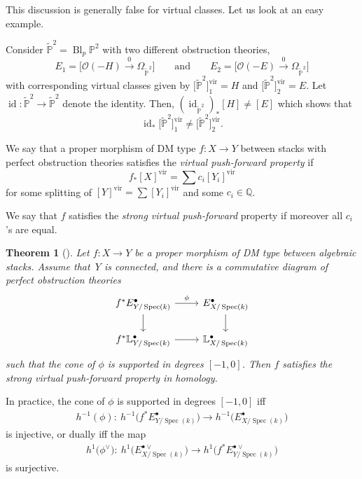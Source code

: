 \documentclass[pdftex]{sigma}
\numberwithin{equation}{section}
\newtheorem{Theorem}{Theorem}[section]
\newcommand{\vv}{\mathrm{vir}}
\newcommand{\Spec}{\operatorname{Spec}}
\newcommand{\PP}{\mathbb P}
\begin{document}
This discussion is generally false for virtual classes. Let us look at an easy example.
\begin{Example} Consider $\tilde{\mathbb P}^2=\operatorname{Bl}_p\PP^2$ with two different obstruction theories,
\begin{equation*}
 E_1=\big[\mathcal O(-H)\xrightarrow{0}\Omega_{\tilde{\mathbb P}^2}\big] \qquad\text{and}\qquad E_2=\big[\mathcal O(-E)\xrightarrow{0}\Omega_{\tilde{\mathbb P}^2}\big]
\end{equation*}
with corresponding virtual classes given by $\big[\tilde{\mathbb P}^2\big]^{\vv}_1=H$ and $\big[\tilde{\mathbb P}^2\big]^{\vv}_2=E$. Let $\operatorname{id}\colon \tilde{\mathbb P}^2\to \tilde{\mathbb P}^2$ denote the identity. Then, $(\operatorname{id}_{\tilde{\mathbb P}^2})_*[H]\neq[E]$ which shows that
\[\operatorname{id}_* \big[\tilde{\mathbb P}^2\big]^{\vv}_1\neq \big[\tilde{\mathbb P}^2\big]^{\vv}_2.
\]
\end{Example}
\begin{Definition}\label{defvpf} We say that a proper morphism of DM type $f\colon X\to Y$ between stacks with perfect obstruction theories satisfies the \emph{virtual push-forward property} if
 \[f_*[X]^{\vv}=\sum c_i[Y_i]^{\vv}
 \]
 for some splitting of $[Y]^{\vv}=\sum[Y_i]^{\vv}$ and some $c_i\in\mathbb Q$.

 We say that $f$ satisfies the \emph{strong virtual push-forward} property if moreover all $c_i$'s are equal.
\end{Definition}
\begin{Theorem}[\cite{vir-push}] \label{vpf1} Let $f\colon X\to Y$ be a proper morphism of DM type between algebraic stacks. Assume that~$Y$ is connected, and there is a commutative diagram of perfect obstruction theories
 \[
 \begin{tikzcd}
 f^*E^\bullet_{Y/\Spec(k)}\ar[r,"\phi"]\ar[d] & E^\bullet_{X/\Spec(k)} \ar[d] \\
 f^*\mathbb L^\bullet_{Y/\Spec(k)}\ar[r] & \mathbb L^\bullet_{X/\Spec(k)}
 \end{tikzcd}
 \]
such that the cone of $\phi$ is supported in degrees $[-1,0]$. Then $f$ satisfies the strong virtual push-forward property in homology.
\end{Theorem}
In practice, the cone of $\phi$ is supported in degrees $[-1,0]$ iff
\begin{gather*}h^{-1}(\phi)\colon \ h^{-1}\big(f^*E^\bullet_{Y/\Spec(k)}\big)\to h^{-1}\big(E^\bullet_{X/\Spec(k)}\big)\end{gather*} is injective, or dually iff the map \begin{gather*}h^{1}\big(\phi^\vee\big)\colon \ h^{1}\big(E^{\bullet\vee}_{X/\Spec(k)}\big) \to h^{1}\big(f^*E^{\bullet\vee}_{Y/\Spec(k)}\big)\end{gather*} is surjective.
\end{document}
